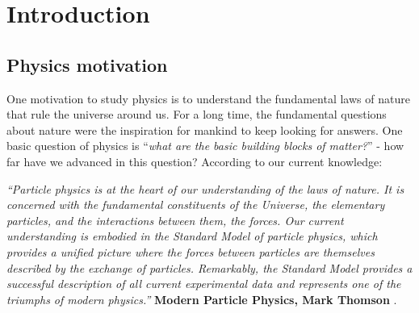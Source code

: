\chapter{Introduction}\label{chp:introduction}
\thispagestyle{headings}
 

\section{Physics motivation}

\hspace{0.635cm}One motivation to study physics is to understand the
fundamental laws of nature that rule the universe around us. For a long time,
the fundamental questions about nature were the inspiration for mankind
to keep looking for answers. One basic question of physics is 
``\textit{what are the basic building blocks of matter?}'' - how far have we advanced
in this question? According to our current knowledge:\newline

\parbox{0.9\textwidth}{\raggedright\textit{``Particle physics is at the heart of our 
understanding of the laws of nature. It is concerned with the fundamental 
constituents of the Universe, the elementary particles, and the interactions 
between them, the forces. Our current understanding is embodied in the Standard 
Model of particle physics, which provides a unified picture where the forces 
between particles are themselves described by the exchange of particles. 
Remarkably, the Standard Model provides a successful description of all current 
experimental data and represents one of the triumphs of modern physics.''} 
\textbf{Modern Particle Physics, Mark Thomson} \textnormal{\cite{thomson2013modern}}. 
} 
\newline